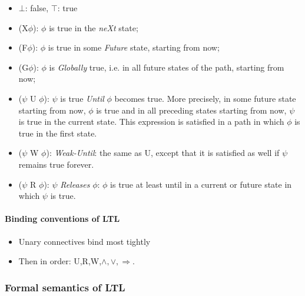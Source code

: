 \documentclass[10pt,a4paper]{article}
\theoremstyle{definition}
\begin{document}
\begin{itemize}
	\item $\bot$: false, $\top$: true
	\item (X$\phi$): $\phi$ is true in the \textit{neXt} state;
	\item (F$\phi$): $\phi$ is true in some \textit{Future} state, starting from now;
	\item (G$\phi$): $\phi$ is \textit{Globally} true, i.e. in all future states of the path, starting from now;
	\item ($\psi$ U $\phi$): $\psi$ is true \textit{Until} $\phi$ becomes true. More precisely, in some future state starting from now, $\phi$ is true and in all preceding states starting from now, $\psi$ is true in the current state. This expression is satisfied in a path in which $\phi$ is true in the first state.
	\item ($\psi$ W $\phi$): \textit{Weak-Until}: the same as U, except that it is satisfied as well if $\psi$ remains true forever.
	\item ($\psi$ R $\phi$): $\psi$ \textit{Releases} $\phi$: $\phi$ is true at least until in a current or future state in which $\psi$ is true.
\end{itemize}

\paragraph{Binding conventions of LTL}
\begin{itemize}
	\item Unary connectives bind most tightly
	\item Then in order: U,R,W,$\land, \lor, \Rightarrow.$
\end{itemize}

\subsubsection{Formal semantics of LTL}
\end{document}

